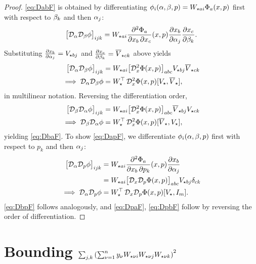 \documentclass[a4paper]{cas-dc}
\begin{document}
\begin{proof}
    \eqref{eq:DabF} is obtained by differentiating \(\phi_i(\A,\B,p) = \W[ai]\Phi_a(x,p)\) first with respect to \(\B_k\) and then \(\A_j\):
    \begin{equation*}
        \bigl[\Da\Db\phi\bigr]_{ijk} = \W[ai] \pdv{\Phi_a}{x_b, x_c}(x,p) \pdv{x_b}{\A_j} \pdv{x_c}{\B_k}.
    \end{equation*}
    Substituting \(\pdv{x_b}{\A_j}=\V[bj]\) and \(\pdv{x_c}{\B_k}=\Vbar[ck]\) above yields
    \begin{align*}
        \bigl[\Da\Db\phi\bigr]_{ijk} & = \W[ai] \bigl[\Dx^2\Phi(x,p)\bigr]_{abc} \V[bj]\Vbar[ck] \\
        \implies \Da\Db\phi          & = \W^{\top}\,\Dx^2\Phi(x,p)[\V,\Vbar],
    \end{align*}
    in multilinear notation. Reversing the differentiation order,
    \begin{align*}
        \bigl[\Db\Da\phi\bigr]_{ijk} & = \W[ai] \bigl[\Dx^2\Phi(x,p)\bigr]_{abc} \Vbar[bj]\V[ck] \\
        \implies \Db\Da\phi          & = \W^{\top}\,\Dx^2\Phi(x,p)[\Vbar,\V],
    \end{align*}
    yielding \eqref{eq:DbaF}. To show \eqref{eq:DapF}, we differentiate \(\phi_i(\A,\B,p)\) first with respect to \(p_k\) and then \(\A_j\):
    \begin{align*}
        \bigl[\Da\Dp\phi\bigr]_{ijk} & = \W[ai] \pdv{\Phi_a}{x_b, p_k}(x,p) \pdv{x_b}{\A_j}          \\
                                     & = \W[ai] \bigl[\Dx\Dp\Phi(x,p)\bigr]_{abc} \V[bj] \delta_{ck} \\
        \implies \Da\Dp\phi          & = \W^{\top}\,\Dx\Dp\Phi(x,p)[\V,I_m].
    \end{align*}
    \eqref{eq:DbpF} follows analogously, and \eqref{eq:DpaF}, \eqref{eq:DpbF} follow by reversing the order of differentiation.
\end{proof}

\section{Bounding $\sum_{j,k} \left(\sum_{\nu=1}^{n} y_\nu \W[\nu i]\W[\nu j]\W[\nu k]\right)^{2}$}
\label{app:Q}
\end{document}
